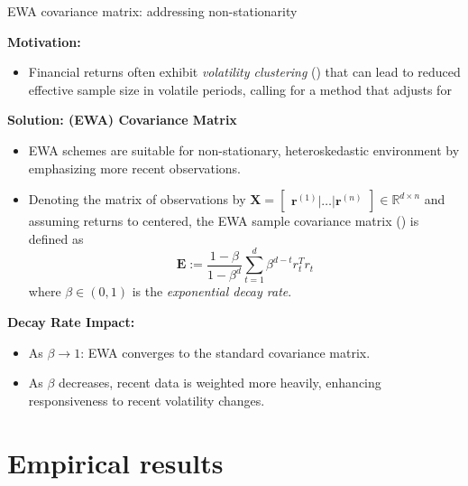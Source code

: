 \documentclass[dvipsnames,mathserif]{beamer}
\newcommand\mypv{\vfill \ifthenelse{\boolean{withPause}}{ \pause }{}}
\begin{document}
\begin{frame}{EWA covariance matrix: addressing non-stationarity}
\footnotesize

    \textbf{Motivation:}
    \begin{itemize}
        \item Financial returns often exhibit \textit{volatility clustering} (\cite{Mandelbrot}) that can lead to reduced effective sample size in volatile periods, calling for a method that adjusts for 
    \end{itemize}

\mypv

    \textbf{Solution:  (EWA) Covariance Matrix}
    \begin{itemize}
        \item EWA schemes are suitable for non-stationary, heteroskedastic environment by emphasizing more recent observations.
        \item Denoting the matrix of observations by $\bm{X} = \begin{bmatrix} \mathbf{r}^{(1)} | \hdots |\mathbf{r}^{(n)}\end{bmatrix} \in \mathbb{R}^{d \times n}$ and assuming returns to centered, the EWA sample covariance matrix (\cite{TanZohren}) is defined as
        \[
        \bm{E} := \frac{1 - \beta}{1 - \beta^d} \sum_{t=1}^{d} \beta^{d-t} r_t^T r_t
        \]
        where \( \beta \in (0, 1) \) is the \textit{exponential decay rate}.
    \end{itemize}

\mypv 
    
    \textbf{Decay Rate Impact:}
    \begin{itemize}
        \item As \( \beta \to 1 \): EWA converges to the standard covariance matrix.
        \item As \( \beta \) decreases, recent data is weighted more heavily, enhancing responsiveness to recent volatility changes.
    \end{itemize}

\end{frame}




\section{Empirical results}
\label{empirical}
\end{document}
